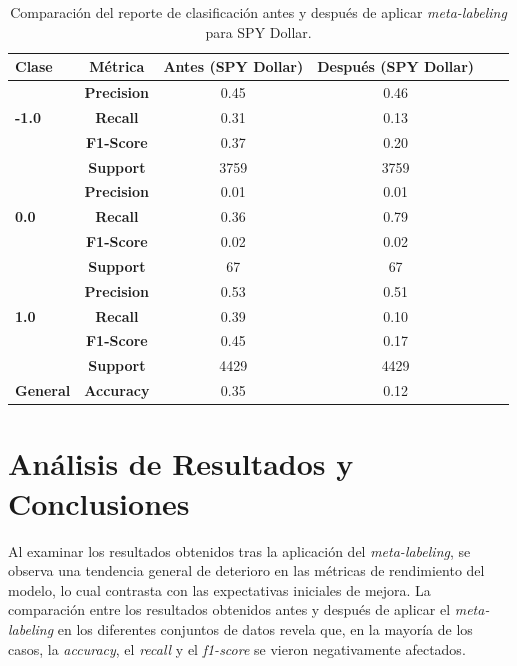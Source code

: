 \documentclass[a4paper,12pt, twoside]{report}
\begin{document}
\begin{table}[h!]
    \centering
    \begin{tabular}{lccccc}
    \hline
    \textbf{Clase} & \textbf{Métrica} & \textbf{Antes (SPY Dollar)} & \textbf{Después (SPY Dollar)} \\
    \hline
    \multirow{3}{*}{\textbf{-1.0}} & \textbf{Precision} & 0.45 & 0.46 \\
                                   & \textbf{Recall}    & 0.31 & 0.13 \\
                                   & \textbf{F1-Score}  & 0.37 & 0.20 \\
                                   & \textbf{Support}   & 3759 & 3759 \\
    \hline
    \multirow{3}{*}{\textbf{0.0}} & \textbf{Precision}  & 0.01 & 0.01 \\
                                  & \textbf{Recall}     & 0.36 & 0.79 \\
                                  & \textbf{F1-Score}   & 0.02 & 0.02 \\
                                  & \textbf{Support}    & 67 & 67 \\
    \hline
    \multirow{3}{*}{\textbf{1.0}} & \textbf{Precision}  & 0.53 & 0.51 \\
                                  & \textbf{Recall}     & 0.39 & 0.10 \\
                                  & \textbf{F1-Score}   & 0.45 & 0.17 \\
                                  & \textbf{Support}    & 4429 & 4429 \\
    \hline
    \textbf{General} & \textbf{Accuracy} & 0.35 & 0.12 \\
    \hline
    \end{tabular}
    \caption{Comparación del reporte de clasificación antes y después de aplicar \textit{meta-labeling} para SPY Dollar.}
    \label{tab:classification_report_spy_dollar}
\end{table}
    

\section{Análisis de Resultados y Conclusiones}

Al examinar los resultados obtenidos tras la aplicación del \textit{meta-labeling}, se observa una tendencia general de 
deterioro en las métricas de rendimiento del modelo, lo cual contrasta con las expectativas iniciales de mejora. La 
comparación entre los resultados obtenidos antes y después de aplicar el \textit{meta-labeling} en los diferentes 
conjuntos de datos revela que, en la mayoría de los casos, la \textit{accuracy}, el \textit{recall} y el \textit{f1-score} 
se vieron negativamente afectados.
\end{document}

